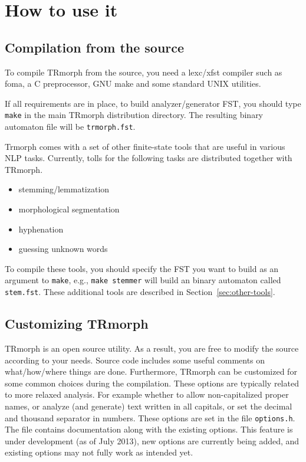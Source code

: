 \documentclass[twocolumn]{article}
\begin{document}
\section{How to use it}

\subsection{Compilation from the source}

To compile TRmorph from the source, you need a lexc/xfst compiler such
as foma, a C preprocessor, GNU make and some standard UNIX utilities.

If all requirements are in place, to build analyzer/generator FST, you
should type \lstinline{make} in the main TRmorph distribution
directory. The resulting binary automaton file will be
\lstinline{trmorph.fst}.

Trmorph comes with a set of other finite-state tools that are useful
in various NLP tasks. Currently, tolls for the following tasks are
distributed together with TRmorph.
\begin{itemize}\addtolength{\itemsep}{-0.5\baselineskip}
\item stemming/lemmatization
\item morphological segmentation
\item hyphenation
\item guessing unknown words
\end{itemize}

To compile these tools, you should specify the FST you want to
build as an argument to \lstinline{make}, e.g., 
\lstinline{make stemmer} 
will build an binary automaton called \lstinline{stem.fst}.
These additional tools are described in Section~\ref{sec:other-tools}.

\subsection{Customizing TRmorph}

TRmorph is an open source utility. As a result, you are free to modify
the source according to your needs. Source code includes some useful
comments on what/how/where things are done. Furthermore, TRmorph can
be customized for some common choices during the compilation. These
options are typically related to more relaxed analysis. For example
whether to allow non-capitalized proper names, or analyze (and
generate) text written in all capitals, or set the decimal and
thousand separator in numbers. These options are set in the file
\lstinline{options.h}. The file contains documentation along with the
existing options. This feature is under development (as of July 2013),
new options are currently being added, and existing options may not
fully work as intended yet.
\end{document}
